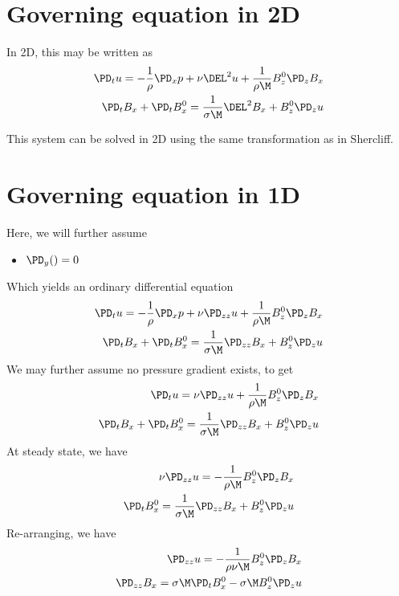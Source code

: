 \documentclass[11pt]{article}
\begin{document}
\section{Governing equation in 2D}
In 2D, this may be written as
\begin{equation}\begin{aligned}
\PD_t u                 = -\frac{1}{\rho}\PD_x p+ \nu \DEL^2 u + \frac{1}{\rho \M} B_z^0 \PD_z B_x \\
\PD_t B_x + \PD_t B_x^0 = \frac{1}{\sigma \M} \DEL^2 B_x + B_z^0 \PD_z u \\
\end{aligned} \end{equation}

This system can be solved in 2D using the same transformation as in Shercliff.

\section{Governing equation in 1D}
Here, we will further assume
\begin{itemize}\setlength\itemsep{-1em}
	\item $\PD_y () = 0$
\end{itemize}
Which yields an ordinary differential equation
\begin{equation}\begin{aligned}
\PD_t u                 = -\frac{1}{\rho}\PD_x p+ \nu \PD_{zz} u + \frac{1}{\rho \M} B_z^0 \PD_z B_x \\
\PD_t B_x + \PD_t B_x^0 = \frac{1}{\sigma \M} \PD_{zz} B_x + B_z^0 \PD_z u \\
\end{aligned} \end{equation}
We may further assume no pressure gradient exists, to get
\begin{equation}\begin{aligned}
\PD_t u                 = \nu \PD_{zz} u + \frac{1}{\rho \M} B_z^0 \PD_z B_x \\
\PD_t B_x + \PD_t B_x^0 = \frac{1}{\sigma \M} \PD_{zz} B_x + B_z^0 \PD_z u \\
\end{aligned} \end{equation}
At steady state, we have
\begin{equation}\begin{aligned}
\nu \PD_{zz} u = - \frac{1}{\rho \M} B_z^0 \PD_z B_x \\
\PD_t B_x^0    = \frac{1}{\sigma \M} \PD_{zz} B_x + B_z^0 \PD_z u \\
\end{aligned} \end{equation}
Re-arranging, we have
\begin{equation}\begin{aligned}
\PD_{zz} u = - \frac{1}{\rho \nu \M} B_z^0 \PD_z B_x \\
\PD_{zz} B_x = \sigma \M \PD_t B_x^0 - \sigma \M B_z^0 \PD_z u \\
\end{aligned} \end{equation}
\end{document}
